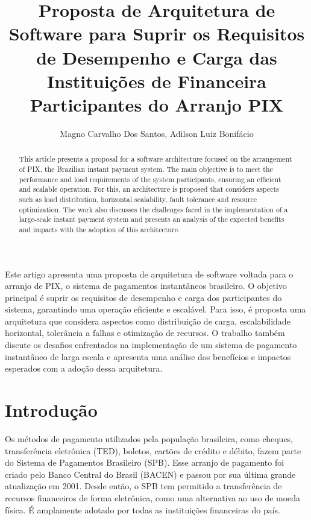 \documentclass[12pt]{article}
\title{Proposta de Arquitetura de Software para Suprir os Requisitos de Desempenho e Carga das Instituições de Financeira Participantes do Arranjo PIX}
\author{Magno Carvalho Dos Santos\inst{1}, Adilson Luiz Bonifácio\inst{1}}
\begin{document}
\maketitle

\begin{abstract}
  This article presents a proposal for a software architecture focused on the arrangement of PIX, the Brazilian instant payment system. The main objective is to meet the performance and load requirements of the system participants, ensuring an efficient and scalable operation. For this, an architecture is proposed that considers aspects such as load distribution, horizontal scalability, fault tolerance and resource optimization. The work also discusses the challenges faced in the implementation of a large-scale instant payment system and presents an analysis of the expected benefits and impacts with the adoption of this architecture.
\end{abstract}

\begin{resumo}
  Este artigo apresenta uma proposta de arquitetura de software voltada para o arranjo de PIX, o sistema de pagamentos instantâneos brasileiro. O objetivo principal é suprir os requisitos de desempenho e carga dos participantes do sistema, garantindo uma operação eficiente e escalável. Para isso, é proposta uma arquitetura que considera aspectos como distribuição de carga, escalabilidade horizontal, tolerância a falhas e otimização de recursos. O trabalho também discute os desafios enfrentados na implementação de um sistema de pagamento instantâneo de larga escala e apresenta uma análise dos benefícios e impactos esperados com a adoção dessa arquitetura.
\end{resumo}


\section{Introdução}

Os métodos de pagamento utilizados pela população brasileira, como cheques, transferência eletrônica (TED), boletos, cartões de crédito e débito, fazem parte do Sistema de Pagamentos Brasileiro (SPB). Esse arranjo de pagamento foi criado pelo Banco Central do Brasil (BACEN) e passou por sua última grande atualização em 2001. Desde então, o SPB tem permitido a transferência de recursos financeiros de forma eletrônica, como uma alternativa ao uso de moeda física. É amplamente adotado por todas as instituições financeiras do país.
\end{document}
